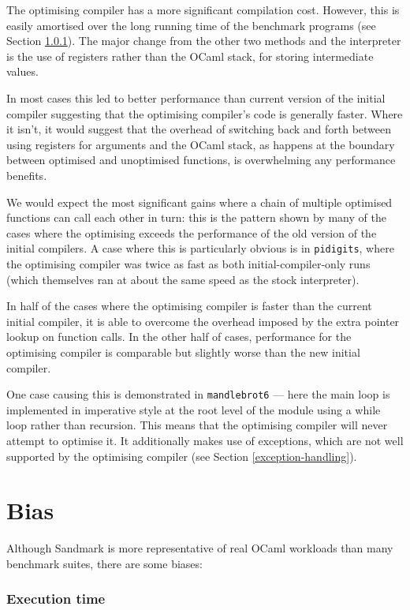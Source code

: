 The optimising compiler has a more significant compilation cost. However, this is easily amortised
over the long running time of the benchmark programs (see Section \ref{bias-exec-time}). The major
change
from the other two methods and the interpreter is the use of registers rather than the OCaml stack,
for storing intermediate values.

In most cases this led to better performance than current version of the initial compiler
suggesting
that the optimising compiler's code is generally faster. Where it isn't, it would suggest that the
overhead of switching back and forth between using registers for arguments and the OCaml stack, as
happens at the boundary between optimised and unoptimised functions, is overwhelming any
performance
benefits.

We would expect the most significant gains where a chain of multiple optimised functions can call
each other in turn: this is the pattern shown by many of the cases where the optimising exceeds the
performance of the old version of the initial compilers. A case where this is particularly obvious
is in \texttt{pidigits}, where the optimising compiler was twice as fast as both
initial-compiler-only runs (which themselves ran at about the same speed as the stock interpreter).

In half of the cases where the optimising compiler is faster than the current initial
compiler, it is able to overcome the overhead imposed by the extra pointer lookup on function
calls.	In the other half of cases, performance for the optimising compiler is comparable but
slightly
worse than the new initial compiler.

One case causing this is demonstrated in \texttt{mandlebrot6} --- here the main loop is implemented
in
imperative style at the root level of the module using a while loop rather than recursion. This
means that the optimising compiler will never attempt to optimise it. It additionally makes use of
exceptions, which are not well supported by the optimising compiler (see Section
\ref{exception-handling}).

\section{Bias}

Although Sandmark is more representative of real OCaml workloads than many benchmark suites, there
are some biases:

\subsubsection{Execution time} \label{bias-exec-time}

